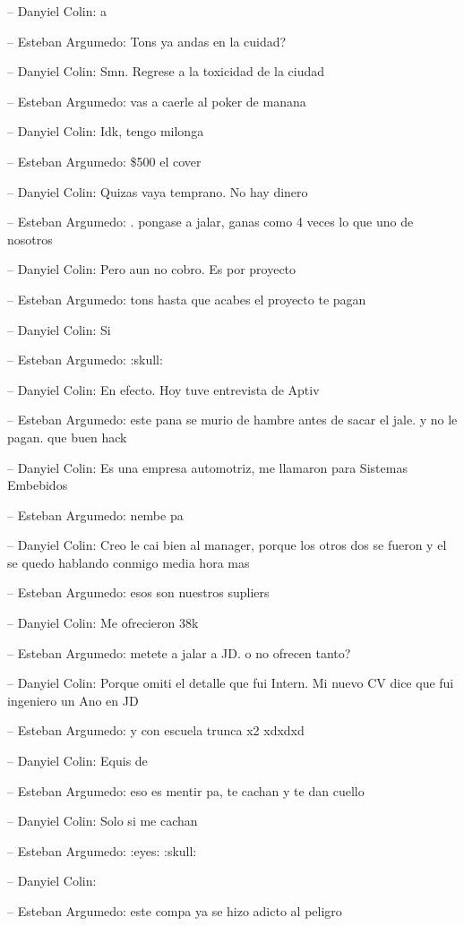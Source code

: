 -- Danyiel Colin: a

-- Esteban Argumedo: Tons ya andas en la cuidad?

-- Danyiel Colin: Smn. Regrese a la toxicidad de la ciudad

-- Esteban Argumedo: vas a caerle al poker de manana

-- Danyiel Colin: Idk, tengo milonga

-- Esteban Argumedo: \$500 el cover

-- Danyiel Colin: Quizas vaya temprano. No hay dinero

-- Esteban Argumedo: . pongase a jalar, ganas como 4 veces lo que uno de
nosotros

-- Danyiel Colin: Pero aun no cobro. Es por proyecto

-- Esteban Argumedo: tons hasta que acabes el proyecto te pagan

-- Danyiel Colin: Si

-- Esteban Argumedo: :skull:

-- Danyiel Colin: En efecto. Hoy tuve entrevista de Aptiv

-- Esteban Argumedo: este pana se murio de hambre antes de sacar el
jale. y no le pagan. que buen hack

-- Danyiel Colin: Es una empresa automotriz, me llamaron para Sistemas
Embebidos

-- Esteban Argumedo: nembe pa

-- Danyiel Colin: Creo le cai bien al manager, porque los otros dos se
fueron y el se quedo hablando conmigo media hora mas

-- Esteban Argumedo: esos son nuestros supliers

-- Danyiel Colin: Me ofrecieron 38k

-- Esteban Argumedo: metete a jalar a JD. o no ofrecen tanto?

-- Danyiel Colin: Porque omiti el detalle que fui Intern. Mi nuevo CV
dice que fui ingeniero un Ano en JD

-- Esteban Argumedo: y con escuela trunca x2 xdxdxd

-- Danyiel Colin: Equis de

-- Esteban Argumedo: eso es mentir pa, te cachan y te dan cuello

-- Danyiel Colin: Solo si me cachan

-- Esteban Argumedo: :eyes: :skull:

-- Danyiel Colin:

-- Esteban Argumedo: este compa ya se hizo adicto al peligro

